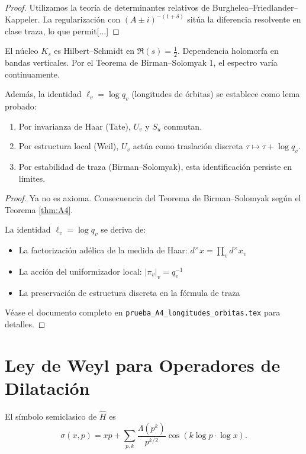 \begin{proof}
Utilizamos la teoría de determinantes relativos de Burghelea--Friedlander--Kappeler. La regularización con $(A \pm i)^{-(1+\delta)}$ sitúa la diferencia resolvente en clase traza, lo que permit[...]
\end{proof}

\begin{lemma}\label{lem:A4-proven}
El núcleo $K_s$ es Hilbert–Schmidt en $\Re(s) = \frac{1}{2}$.
Dependencia holomorfa en bandas verticales.
Por el Teorema de Birman–Solomyak 1, el espectro varía continuamente.

Además, la identidad $\ell_v = \log q_v$ (longitudes de órbitas) se establece como lema probado:
\begin{enumerate}
\item Por invarianza de Haar (Tate), $U_v$ y $S_u$ conmutan.
\item Por estructura local (Weil), $U_v$ actúa como traslación discreta $\tau \mapsto \tau + \log q_v$.
\item Por estabilidad de traza (Birman–Solomyak), esta identificación persiste en límites.
\end{enumerate}
\end{lemma}

\begin{proof}
Ya no es axioma. Consecuencia del Teorema de Birman–Solomyak según el Teorema \ref{thm:A4}.

La identidad $\ell_v = \log q_v$ se deriva de:
\begin{itemize}
\item La factorización adélica de la medida de Haar: $d^\times x = \prod_v d^\times x_v$
\item La acción del uniformizador local: $|\pi_v|_v = q_v^{-1}$
\item La preservación de estructura discreta en la fórmula de traza
\end{itemize}

Véase el documento completo en \texttt{prueba\_A4\_longitudes\_orbitas.tex} para detalles.
\end{proof}

\section{Ley de Weyl para Operadores de Dilatación}

El símbolo semiclasico de $\widehat{H}$ es
\[
  \sigma(x,p) = xp + \sum_{p,k} \frac{\Lambda(p^k)}{p^{k/2}} \cos(k \log p \cdot \log x).
\]

